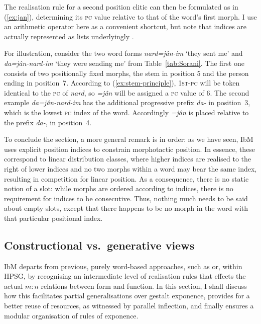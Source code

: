 \documentclass[output=paper
 	        ,biblatex
                ,babelshorthands
                ,newtxmath
                ,draftmode
                ,colorlinks, citecolor=brown
]{langscibook}
\begin{document}
\begin{exe}
\begin{xlist}
\begin{exe}
\begin{xlist}
The realisation rule for a second position clitic can then be
formulated  as
in (\ref{ex:jan}), determining its \textsc{pc} value relative to that of the
word's first morph. I use an arithmetic operator here as a convenient
shortcut, but note that indices are actually represented as lists 
underlyingly \citep{bonami-crysmann:2013}. 

\begin{exe}
  \ex \label{ex:jan}
\end{exe}

For illustration, consider the two word forms \textit{nard=jân-im}
`they sent me' and \textit{da=jân-nard-im} `they were sending me' from
Table~\ref{tab:Sorani}. The first one consists of two positionally
fixed morphs, the stem in position 5 and the person ending in
position~7. According to (\ref{ex:stem-principle}), \textsc{1st-pc}
will be token identical to the \textsc{pc} of \textit{nard}, so
\textit{=jân} will be assigned a \textsc{pc} value of 6. The second
example \textit{da=jân-nard-im} has the additional progressive prefix
\textit{da-} in position~3, which is the lowest \textsc{pc} index of the word. Accordingly
\textit{=jân} is placed relative to the prefix \textit{da-}, in position~4.

To conclude the section, a more general remark is in order: as we have
seen, IbM uses explicit position indices to constrain morphotactic
position. In essence, these correspond to linear distribution classes,
where higher indices are realised to the right of lower indices
and no two morphs within a word may bear the same index, resulting in
competition for linear position. As a consequence, there is no static
notion of a slot: while morphs are ordered according to indices, there
is no requirement for indices to be consecutive. Thus, nothing much
needs to be said about empty slots, except that there happens to be no
morph in the word with that particular positional index. 


\subsection{Constructional vs.\ generative views}
\label{sec:ConstrGen}

IbM departs from previous, purely word-based approaches, such as
\citet{Blevins14} or, within HPSG, \citet[Section~5.2.2]{Koenig99} by recognising an
intermediate level of realisation rules that effects the actual $m:n$
relations between form and function. In this section, I shall discuss
how this facilitates partial generalisations over gestalt exponence,
provides for a better reuse of resources, as witnessed by parallel
inflection, and finally ensures a modular organisation of rules of
exponence.


\end{xlist}
\end{exe}
\end{xlist}
\end{exe}
\end{document}
